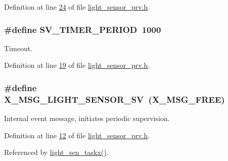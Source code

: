 Definition at line \hyperlink{a00024_source_l00024}{24} of file \hyperlink{a00024_source}{light\+\_\+sensor\+\_\+prv.\+h}.

\hypertarget{a00024_a8a535456285f4602701c814d7b69cc68}{
\subsubsection[{S\+V\+\_\+\+T\+I\+M\+E\+R\+\_\+\+P\+E\+R\+I\+O\+D}]{\setlength{\rightskip}{0pt plus 5cm}\#define S\+V\+\_\+\+T\+I\+M\+E\+R\+\_\+\+P\+E\+R\+I\+O\+D~1000}}\label{a00024_a8a535456285f4602701c814d7b69cc68}


Timeout. 



Definition at line \hyperlink{a00024_source_l00019}{19} of file \hyperlink{a00024_source}{light\+\_\+sensor\+\_\+prv.\+h}.

\hypertarget{a00024_a5877f449ae4b7e77914fedf212c3d01f}{
\subsubsection[{X\+\_\+\+M\+S\+G\+\_\+\+L\+I\+G\+H\+T\+\_\+\+S\+E\+N\+S\+O\+R\+\_\+\+S\+V}]{\setlength{\rightskip}{0pt plus 5cm}\#define X\+\_\+\+M\+S\+G\+\_\+\+L\+I\+G\+H\+T\+\_\+\+S\+E\+N\+S\+O\+R\+\_\+\+S\+V~({\bf X\+\_\+\+M\+S\+G\+\_\+\+F\+R\+E\+E})}}\label{a00024_a5877f449ae4b7e77914fedf212c3d01f}


Internal event message, initiates periodic supervision. 



Definition at line \hyperlink{a00024_source_l00012}{12} of file \hyperlink{a00024_source}{light\+\_\+sensor\+\_\+prv.\+h}.



Referenced by \hyperlink{a00047_source_l00065}{light\+\_\+sen\+\_\+taskx()}.

